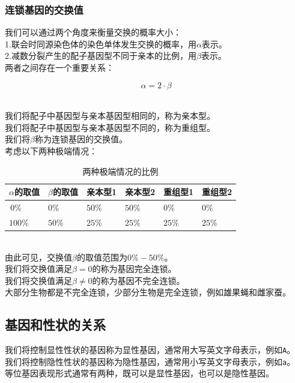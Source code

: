 \documentclass[UTF8]{ctexart}
\begin{document}
\subsubsection{连锁基因的交换值}
    我们可以通过两个角度来衡量交换的概率大小：\\[3mm]
    1.联会时同源染色体的染色单体发生交换的概率，用$\alpha$表示。\\[3mm]
    2.减数分裂产生的配子基因型不同于亲本的比例，用$\beta$表示。\\[6mm]
    两者之间存在一个重要关系：
    \begin{large}
        \begin{equation*}
            \alpha=2\cdot\beta
        \end{equation*}
    \end{large}\\
    我们将配子中基因型与亲本基因型相同的，称为亲本型。\\[3mm]
    我们将配子中基因型与亲本基因型不同的，称为重组型。\\[3mm]
    我们将$\beta$称为连锁基因的交换值。\\[8mm]
    考虑以下两种极端情况：\vspace{5pt}
    \begin{table}[h]
        \begin{center}
            \begin{tabular}{l|l|l|l|l|l}
                \hline
                $\alpha$的取值\qquad\qquad&$\beta$的取值\qquad\qquad&亲本型1\qquad&亲本型2\qquad&重组型1\qquad&重组型2\qquad\\ \hline
                $\,0\%$&$0\%$&$50\%$&$50\%$&$0\%$&$0\%$\\ \hline
                $100\%$&$50\%$&$25\%$&$25\%$&$25\%$&$25\%$\\ \hline
            \end{tabular}
            \caption{两种极端情况的比例}
        \end{center}
    \end{table}\\
    由此可见，交换值$\beta$的取值范围为$0\%-50\%$。\\[3mm]
    我们将交换值满足$\beta=0$的称为基因完全连锁。\\[3mm]
    我们将交换值满足$\beta\neq 0$的称为基因不完全连锁。\\[3mm]
    大部分生物都是不完全连锁，少部分生物是完全连锁，例如雄果蝇和雌家蚕。

\newpage

\subsection{基因和性状的关系}
    我们将控制显性性状的基因称为显性基因，通常用大写英文字母表示，例如\texttt{A}。\\[3mm]
    我们将控制隐性性状的基因称为隐性基因，通常用小写英文字母表示，例如\texttt{a}。\\[3mm]
    等位基因表现形式通常有两种，既可以是显性基因，也可以是隐性基因。
\end{document}

